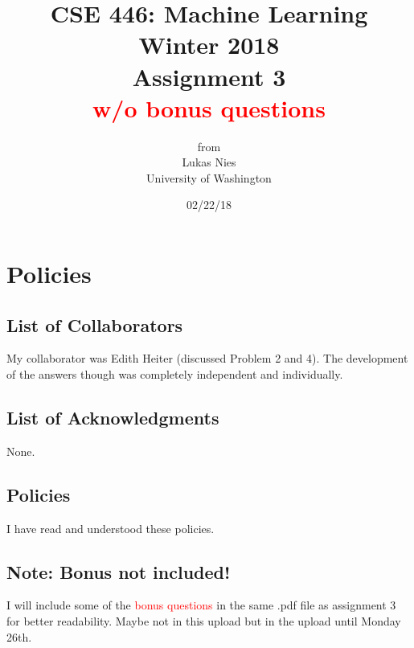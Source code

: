 \documentclass[12pt]{article}
\begin{document}
	
	\title{
		\textbf{\huge{CSE 446: Machine Learning Winter 2018 }} \\[2cm]
		\LARGE{Assignment 3 \\ \textcolor{red}{w/o bonus questions}}\\[1cm]
	}
	\author{from \\ Lukas Nies \\ University of Washington}
	\date{02/22/18}
	\clearpage\maketitle\thispagestyle{empty}
	\newpage

	\tableofcontents
	\setcounter{page}{0}
	\newpage
	
	\setcounter{section}{-1}
	

\section{Policies}

\subsection{List of Collaborators}

My collaborator was Edith Heiter (discussed Problem 2 and 4). The development of the answers though was completely independent and individually.

\subsection{List of Acknowledgments}

None.

\subsection{Policies}

I have read and understood these policies.

\subsection{Note: Bonus not included!}

I will include some of the \textcolor{red}{bonus questions} in the same .pdf file as assignment 3 for better readability. Maybe not in this upload but in the upload until Monday 26th.  

\newpage
\end{document}
